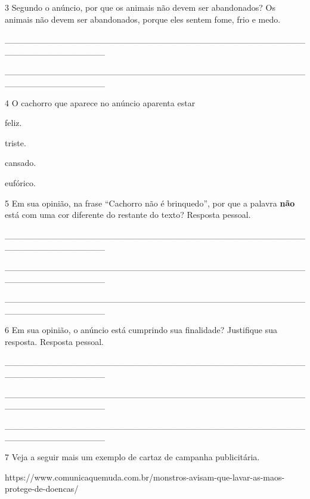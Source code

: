 \num{3} Segundo o anúncio, por que os animais não devem ser abandonados? Os animais não devem ser abandonados, porque eles sentem fome, frio e medo.

\_\_\_\_\_\_\_\_\_\_\_\_\_\_\_\_\_\_\_\_\_\_\_\_\_\_\_\_\_\_\_\_\_\_\_\_\_\_\_\_\_\_\_\_\_\_\_\_\_\_\_\_\_\_\_\_\_\_\_\_\_\_\_\_

\_\_\_\_\_\_\_\_\_\_\_\_\_\_\_\_\_\_\_\_\_\_\_\_\_\_\_\_\_\_\_\_\_\_\_\_\_\_\_\_\_\_\_\_\_\_\_\_\_\_\_\_\_\_\_\_\_\_\_\_\_\_\_\_

\num{4} O cachorro que aparece no anúncio aparenta estar

\begin{escolha}
  \item feliz.
  \item triste.
  \item cansado.
  \item eufórico.
\end{escolha}


\num{5} Em sua opinião, na frase ``Cachorro não é brinquedo'', por que a
palavra \textbf{não} está com uma cor diferente do restante do texto?
Resposta pessoal.

\_\_\_\_\_\_\_\_\_\_\_\_\_\_\_\_\_\_\_\_\_\_\_\_\_\_\_\_\_\_\_\_\_\_\_\_\_\_\_\_\_\_\_\_\_\_\_\_\_\_\_\_\_\_\_\_\_\_\_\_\_\_\_\_

\_\_\_\_\_\_\_\_\_\_\_\_\_\_\_\_\_\_\_\_\_\_\_\_\_\_\_\_\_\_\_\_\_\_\_\_\_\_\_\_\_\_\_\_\_\_\_\_\_\_\_\_\_\_\_\_\_\_\_\_\_\_\_\_

\_\_\_\_\_\_\_\_\_\_\_\_\_\_\_\_\_\_\_\_\_\_\_\_\_\_\_\_\_\_\_\_\_\_\_\_\_\_\_\_\_\_\_\_\_\_\_\_\_\_\_\_\_\_\_\_\_\_\_\_\_\_\_\_

\num{6} Em sua opinião, o anúncio está cumprindo sua finalidade? Justifique
sua resposta. Resposta pessoal.

\_\_\_\_\_\_\_\_\_\_\_\_\_\_\_\_\_\_\_\_\_\_\_\_\_\_\_\_\_\_\_\_\_\_\_\_\_\_\_\_\_\_\_\_\_\_\_\_\_\_\_\_\_\_\_\_\_\_\_\_\_\_\_\_

\_\_\_\_\_\_\_\_\_\_\_\_\_\_\_\_\_\_\_\_\_\_\_\_\_\_\_\_\_\_\_\_\_\_\_\_\_\_\_\_\_\_\_\_\_\_\_\_\_\_\_\_\_\_\_\_\_\_\_\_\_\_\_\_

\_\_\_\_\_\_\_\_\_\_\_\_\_\_\_\_\_\_\_\_\_\_\_\_\_\_\_\_\_\_\_\_\_\_\_\_\_\_\_\_\_\_\_\_\_\_\_\_\_\_\_\_\_\_\_\_\_\_\_\_\_\_\_\_

\num{7} Veja a seguir mais um exemplo de cartaz de campanha publicitária.

https://www.comunicaquemuda.com.br/monstros-avisam-que-lavar-as-maos-protege-de-doencas/

